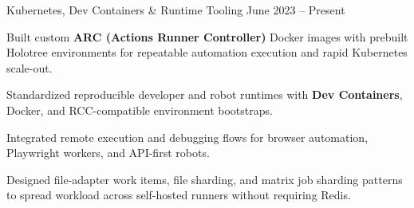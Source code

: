 


\begin{cventries}


\cventry
{Kubernetes, Dev Containers \& Runtime Tooling} %
{} %
{} %
{June 2023 -- Present} %
{ %
\begin{cvitems}
\item {Built custom \textbf{ARC (Actions Runner Controller)} Docker images with prebuilt Holotree environments for repeatable automation execution and rapid Kubernetes scale-out.}
\item {Standardized reproducible developer and robot runtimes with \textbf{Dev Containers}, Docker, and RCC-compatible environment bootstraps.}
\item {Integrated remote execution and debugging flows for browser automation, Playwright workers, and API-first robots.}
\item {Designed file-adapter work items, file sharding, and matrix job sharding patterns to spread workload across self-hosted runners without requiring Redis.}
\end{cvitems}
}


\end{cventries}
